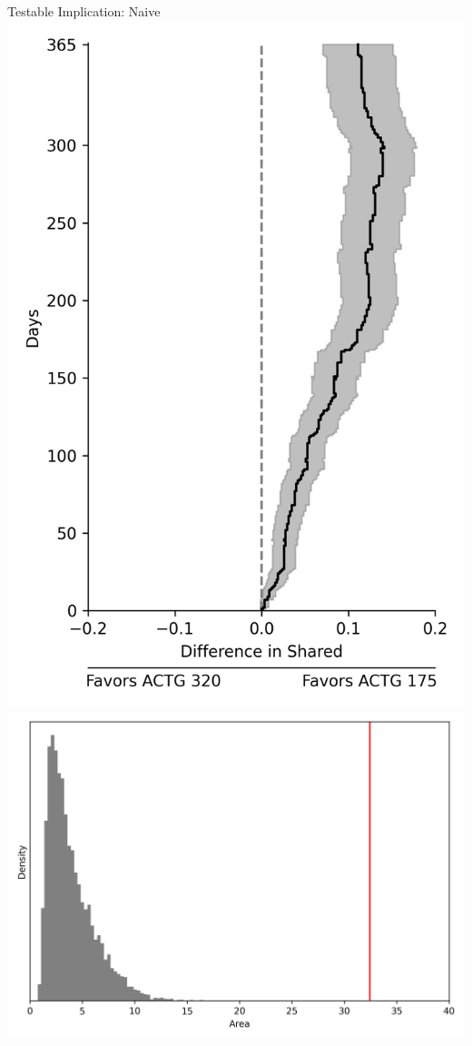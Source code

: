 \documentclass{beamer}
\begin{document}
\begin{frame}{Testable Implication: Naive}
	\centering
	\includegraphics[scale=0.33]{images/diagnostic_graph_naive.png}	
	\includegraphics[scale=0.4]{images/diagnostic_test_naive.png}	
\end{frame}
\end{document}
